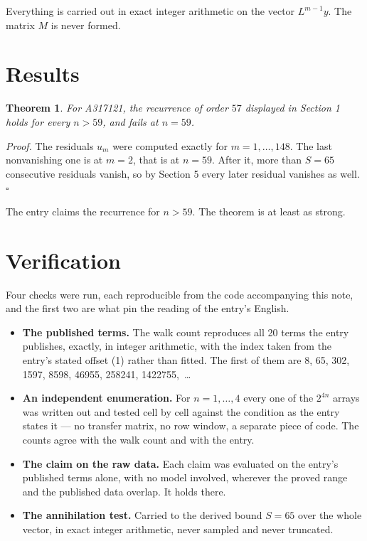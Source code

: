 \documentclass[11pt]{article}
\newtheorem{theorem}{Theorem}
\theoremstyle{definition}
\begin{document}
Everything is carried out in exact integer arithmetic on the vector $L^{m-1}y$. The matrix $M$ is never formed.

\section{Results}

\begin{theorem} For A317121, the recurrence of order $57$ displayed in Section 1 holds for every $n > 59$, and fails at $n = 59$.\end{theorem}

{\itshape Proof.} The residuals $u_m$ were computed exactly for $m = 1,\dots,148$. The last nonvanishing one is at $m = 2$, that is at $n = 59$. After it, more than $S = 65$ consecutive residuals vanish, so by Section 5 every later residual vanishes as well. $\square$

The entry claims the recurrence for $n > 59$. The theorem is at least as strong.

\section{Verification}

Four checks were run, each reproducible from the code accompanying this note, and the first two are what pin the reading of the entry's English.

\begin{itemize}

\item {\bfseries The published terms.} The walk count reproduces all 20 terms the entry publishes, exactly, in integer arithmetic, with the index taken from the entry's stated offset (1) rather than fitted. The first of them are 8, 65, 302, 1597, 8598, 46955, 258241, 1422755,~\dots

\item {\bfseries An independent enumeration.} For $n = 1,\dots,4$ every one of the $2^{4n}$ arrays was written out and tested cell by cell against the condition as the entry states it --- no transfer matrix, no row window, a separate piece of code. The counts agree with the walk count and with the entry.

\item {\bfseries The claim on the raw data.} Each claim was evaluated on the entry's published terms alone, with no model involved, wherever the proved range and the published data overlap. It holds there.

\item {\bfseries The annihilation test.} Carried to the derived bound $S = 65$ over the whole vector, in exact integer arithmetic, never sampled and never truncated.

\end{itemize}
\end{document}
